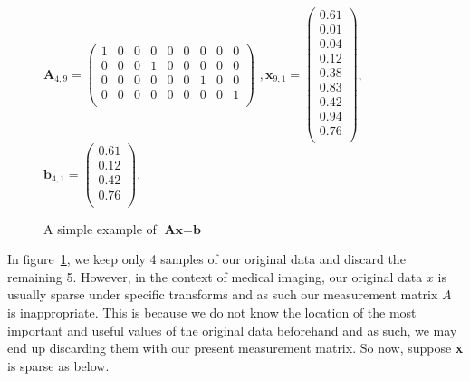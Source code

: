 \documentclass[titlepage,oneside, 12pt]{book}
\theoremstyle{break}
\begin{document}
\begin{figure}[H]
\centering
$
\textbf{A}_{4,9} = \begin{pmatrix}
1 & 0 & 0 & 0 & 0 & 0 & 0 & 0 & 0 \\
0 & 0 & 0 & 1 & 0 & 0 & 0 & 0 & 0 \\
0 & 0 & 0 & 0 & 0 & 0 & 1 & 0 & 0\\
0 & 0 & 0 & 0 & 0 & 0 & 0 & 0 & 1 \\
\end{pmatrix}  
$
$,
\textbf{x}_{9,1} = \begin{pmatrix}
0.61\\
0.01\\
0.04\\
0.12\\
0.38\\
0.83\\
0.42\\
0.94\\
0.76\\
\end{pmatrix}  
$,
$
\textbf{b}_{4, 1} = \begin{pmatrix}
0.61\\
0.12\\
0.42\\
0.76\\
\end{pmatrix}  
$.

\caption{A simple example of $\textbf{Ax} = \textbf{b}$}
\label{fig:CSex1}
\end{figure}

In figure~\ref{fig:CSex1}, we keep only 4 samples of our original data and discard the remaining 5. However, in the context of medical imaging, our original data \textbf{$x$} is usually sparse under specific transforms and as such our measurement matrix \textbf{$A$} is inappropriate. This is because we do not know the location of the most important and useful values of the original data beforehand and as such, we may end up discarding them with our present measurement matrix. So now, suppose \textbf{x} is sparse as below. 
\end{document}
